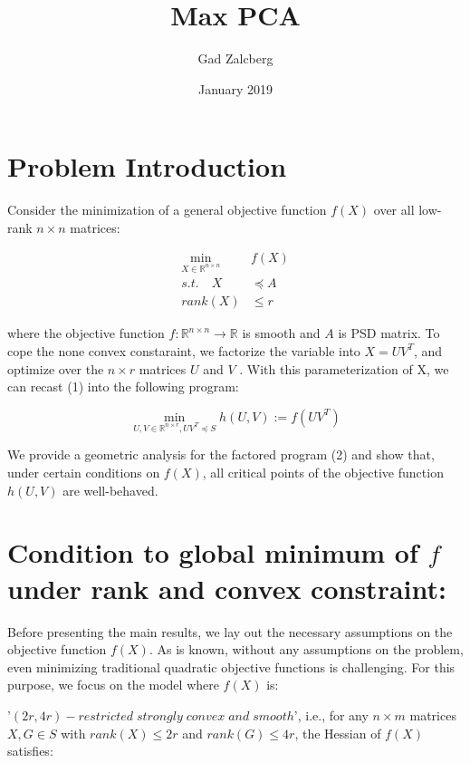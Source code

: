 \documentclass{article}
\title{Max PCA}
\author{Gad Zalcberg }
\date{January 2019}
\begin{document}
\maketitle

\section{Problem Introduction}
Consider the minimization of a general objective function
$f(X)$ over all low-rank $n\times n$ matrices:

\begin{equation}
\begin{split}
\min_{X\in \mathbb{R}^{n\times n}} & f\left(X\right)\\
s.t.\quad X & \preceq A\\
rank\left(X\right) &\le r
\end{split}
\end{equation}

where the objective function $f:\mathbb{R}^{n\times n} \rightarrow \mathbb{R}$ is smooth and $A$ is PSD matrix.
To cope the none convex constaraint, we factorize the variable into $X = U V^T$, and optimize over the $n \times r$ matrices $U$ and $V$ . With this parameterization of X, we can recast (1) into the following program:

\begin{equation}
    \min_{U,V\in \mathbb{R}^{n\times r} ,UV^T\preceq S} h\left(U,V\right):=f\left(UV^T\right)
\end{equation}

We provide a geometric analysis for the factored program (2) and show that, under certain conditions on $f(X)$, all critical points of the objective function $h\left(U,V\right)$ are well-behaved.


\section{Condition to global minimum of $f$ under rank and convex constraint:}

Before presenting the main results, we lay out the necessary assumptions on the objective function $f(X)$. As is known, without any assumptions on the problem, even minimizing traditional quadratic objective functions is challenging. For this purpose, we focus on the model where $f(X)$ is:

'$(2r, 4r)-restricted\; strongly\; convex\; and\; smooth$', i.e., for any $n\times m$ matrices $X, G\in S$ with $rank(X) \le 2r$ and $rank(G) \le 4r$, the Hessian of $f(X)$ satisfies:
\end{document}
